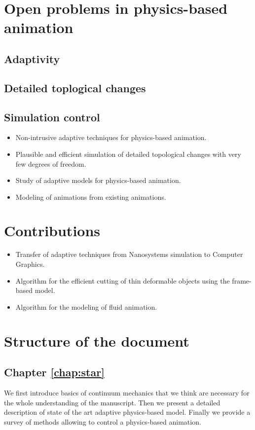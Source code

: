 \section{Open problems in physics-based animation}

\subsection{Adaptivity}

\subsection{Detailed toplogical changes}

\subsection{Simulation control}

\begin{itemize}
    \item Non-intrusive adaptive techniques for physics-based animation.
    \item Plausible and efficient simulation of detailed topological changes with very few degrees of freedom.
    \item Study of adaptive models for physics-based animation.
    \item Modeling of animations from existing animations.
\end{itemize}

\section{Contributions}
\begin{itemize}
    \item Transfer of adaptive techniques from Nanosystems simulation to Computer Graphics.
    \item Algorithm for the efficient cutting of thin deformable objects using the frame-based model.
    \item Algorithm for the modeling of fluid animation.
\end{itemize}

\section{Structure of the document}

\subsection*{Chapter \ref{chap:star}}
We first introduce basics of continuum mechanics that we think are necessary for the whole understanding of the manuscript. Then we present a detailed description of state of the art adaptive physics-based model. Finally we provide a survey of methods allowing to control a physics-based animation. \\

